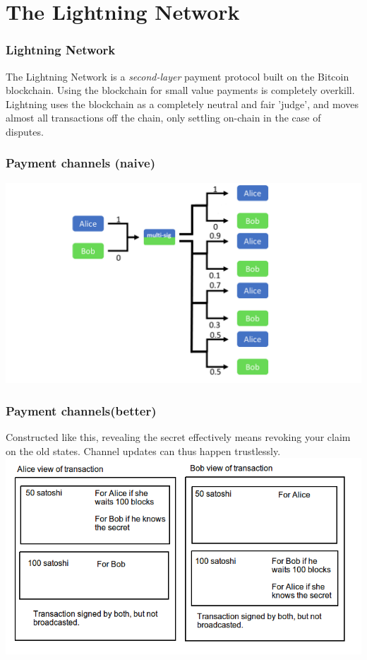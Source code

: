 \documentclass{beamer}
\begin{document}
\section{The Lightning Network}
\begin{frame}
\frametitle{Lightning Network}
The Lightning Network is a \textit{second-layer} payment protocol built on the Bitcoin blockchain. Using the blockchain for small value payments is completely overkill. Lightning uses the blockchain as a completely neutral and fair 'judge', and moves almost all transactions off the chain, only settling on-chain in the case of disputes. 
\end{frame}
\begin{frame}
\frametitle{Payment channels (naive)}
\includegraphics[scale=0.3]{images/channel.png}

\end{frame}
\begin{frame}
\frametitle{Payment channels(better)}
Constructed like this, revealing the secret effectively means revoking your claim on the old states. Channel updates can thus happen trustlessly.
\includegraphics[scale=0.4]{images/asymmetry.png}

\end{frame}
\end{document}
